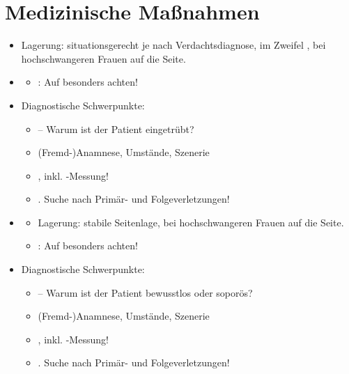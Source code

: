 \chapter{Medizinische Maßnahmen}

{\label{m:bewusstseinstruebung}}{ 

\begin{itemize}
  \item Lagerung: situationsgerecht je nach
  Verdachtsdiagnose, im Zweifel , bei hochschwangeren Frauen auf die
   Seite.
  \item \TxBeiVit \TxMassVitMKBes
  
  \begin{itemize}
    \item {}: Auf 
    besonders achten!
  \end{itemize}
  
  
  \item Diagnostische Schwerpunkte:
  \begin{itemize}
    \item {} -- Warum ist der
    Patient eingetrübt?
    \item (Fremd-)Anamnese, Umstände, Szenerie
    \item {}, inkl. -Messung!
    \item {}. Suche nach Primär- und
    Folgeverletzungen!
  \end{itemize}
\end{itemize}

}

{%
\begin{itemize}
  \item \TxMassVitMKBes
  \begin{itemize}
    \item Lagerung: stabile Seitenlage, bei hochschwangeren Frauen auf die
     Seite.
    \item {}: Auf 
    besonders achten!
  \end{itemize}
  \item Diagnostische Schwerpunkte:
  \begin{itemize}
    \item {} -- Warum ist der Patient bewusstlos oder
    soporös?
    \item (Fremd-)Anamnese, Umstände, Szenerie
    \item {}, inkl. -Messung!
    \item {}. Suche nach Primär- und
    Folgeverletzungen!
  \end{itemize}
\end{itemize}
}

